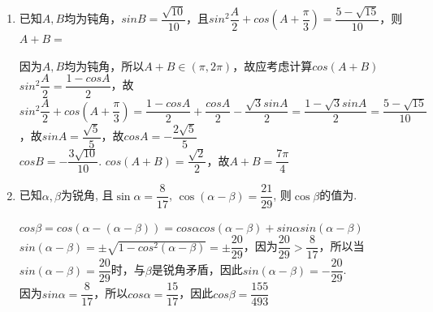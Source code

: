 \begin{enumerate}
\begin{enumerate}
        \begin{jieda}
            $cot(\alpha - \beta) = 2$，$cot\alpha = 3$，即$tan(\alpha - \beta) = \dfrac{1}{2}, tan\alpha = \dfrac{1}{3}$\\
            \textbf{易知$\alpha$是一个固定的角，因此$2\alpha - \beta$是否多解取决于$\beta$是否存在多解} \\
             $\alpha \in (0, \dfrac{\pi}{4})$，故$\alpha - \beta \in (-\pi, -\dfrac{\pi}{4})$，故$\alpha - \beta$是固定的角，因此$2\alpha - \beta$不存在多解，$2\alpha - \beta \in (-\pi, 0)$ \\
            $tan(2\alpha - \beta) = tan(\alpha + \alpha - \beta) = \dfrac{tan\alpha + tan(\alpha-\beta)}{1-tan\alpha \cdot tan(\alpha - \beta)} = 1$，故$2\alpha - \beta = -\dfrac{3\pi}{4}$
        \end{jieda}
        \item 已知$A, B$均为钝角，$sinB = \dfrac{\sqrt{10}}{10}$，且$sin^2\dfrac{A}{2} + cos\left(A+\dfrac{\pi}{3}\right) = \dfrac{5-\sqrt{15}}{10}$，则$A+B = $
        \begin{jieda}
            因为$A, B$均为钝角，所以$A+B \in (\pi, 2\pi)$，故应考虑计算$cos(A+B)$ \\
            $sin^2\dfrac{A}{2} = \dfrac{1-cosA}{2}$，故$sin^2\dfrac{A}{2} + cos\left(A+\dfrac{\pi}{3}\right) = \dfrac{1-cosA}{2} + \dfrac{cosA}{2} - \dfrac{\sqrt{3}sinA}{2} = \dfrac{1-\sqrt{3}sinA}{2} = \dfrac{5-\sqrt{15}}{10}$，故$sinA = \dfrac{\sqrt{5}}{5}$，故$cosA = -\dfrac{2\sqrt{5}}{5}$ \\
            $cosB = -\dfrac{3\sqrt{10}}{10}$. $cos(A+B) = \dfrac{\sqrt{2}}{2}$，故$A+B = \dfrac{7\pi}{4}$
        \end{jieda}
        \item 已知$\alpha,\beta$为锐角, 且$\sin\alpha=\dfrac{8}{17}$, $\cos(\alpha-\beta)=\dfrac{21}{29}$, 
        则$\cos\beta$的值为.
        \begin{jieda}
        $cos\beta = cos(\alpha - (\alpha - \beta)) = cos\alpha cos(\alpha - \beta) + sin\alpha sin(\alpha - \beta)$ \\
        $sin(\alpha - \beta) = \pm \sqrt{1 - cos^2(\alpha - \beta)} = \pm \dfrac{20}{29}$，因为$\dfrac{20}{29} > \dfrac{8}{17}$，所以当$sin(\alpha-\beta) = \dfrac{20}{29}$时，与$\beta$是锐角矛盾，因此$sin(\alpha-\beta) = -\dfrac{20}{29}$. \\
        因为$sin\alpha = \dfrac{8}{17}$，所以$cos\alpha = \dfrac{15}{17}$，因此$cos\beta = \dfrac{155}{493}$
    \end{jieda}

\end{enumerate}
\end{enumerate}

